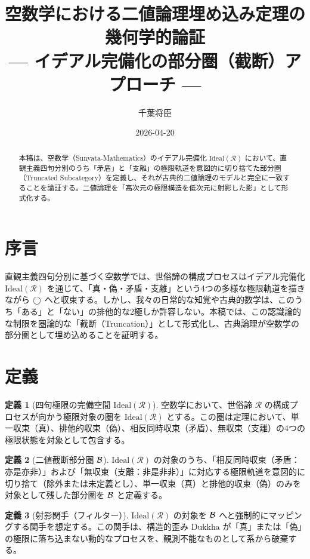 \documentclass[11pt,a4paper]{article}
\newcommand{\ideal}[1]{\mathrm{Ideal}(#1)}
\newcommand{\Dukkha}{\mathrm{Dukkha}}
\newcommand{\Rep}{\mathcal{R}}
\theoremstyle{definition}
\newtheorem{definition}{定義}[section]
\begin{document}
\title{空数学における二値論理埋め込み定理の幾何学的論証\\
--- イデアル完備化の部分圏（截断）アプローチ ---}
\author{千葉将臣}
\date{2026-04-20}
\maketitle

\begin{abstract}
本稿は、空数学（Sunyata-Mathematics）のイデアル完備化 $\ideal{\Rep}$ において、直観主義四句分別のうち「矛盾」と「支離」の極限軌道を意図的に切り捨てた部分圏（Truncated Subcategory）を定義し、それが古典的二値論理のモデルと完全に一致することを論証する。二値論理を「高次元の極限構造を低次元に射影した影」として形式化する。
\end{abstract}

\section*{序言}
直観主義四句分別に基づく空数学では、世俗諦の構成プロセスはイデアル完備化 $\ideal{\Rep}$ を通じて、「真・偽・矛盾・支離」という4つの多様な極限軌道を描きながら $\bigcirc$ へと収束する。しかし、我々の日常的な知覚や古典的数学は、このうち「ある」と「ない」の排他的な2極しか許容しない。本稿では、この認識論的な制限を圏論的な「截断（Truncation）」として形式化し、古典論理が空数学の部分圏として埋め込めることを証明する。

\section{定義}

\begin{definition}[四句極限の完備空間 $\ideal{\Rep}$]
空数学において、世俗諦 $\Rep$ の構成プロセスが向かう極限対象の圏を $\ideal{\Rep}$ とする。この圏は定理において、単一収束（真）、排他的収束（偽）、相反同時収束（矛盾）、無収束（支離）の4つの極限状態を対象として包含する。
\end{definition}

\begin{definition}[二値截断部分圏 $\mathcal{B}$]
$\ideal{\Rep}$ の対象のうち、「相反同時収束（矛盾：亦是亦非）」および「無収束（支離：非是非非）」に対応する極限軌道を意図的に切り捨て（除外または未定義とし）、単一収束（真）と排他的収束（偽）のみを対象として残した部分圏を $\mathcal{B}$ と定義する。
\end{definition}

\begin{definition}[射影関手（フィルター）]
$\ideal{\Rep}$ の対象を $\mathcal{B}$ へと強制的にマッピングする関手を想定する。この関手は、構造的歪み $\Dukkha$ が「真」または「偽」の極限に落ち込まない動的なプロセスを、観測不能なものとして系から破棄する。
\end{definition}
\end{document}
